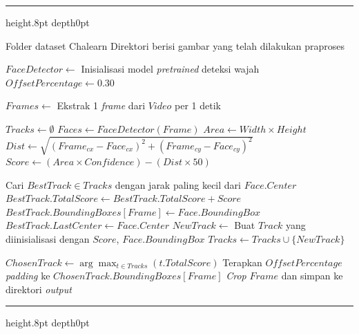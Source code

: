 {
	\vspace{2ex}
	\hrule height.8pt depth0pt \kern4pt
	
	\begin{algorithmic}[1]
		\Input Folder dataset Chalearn
		\Output Direktori berisi gambar yang telah dilakukan praproses
		
		\State $FaceDetector \gets$ Inisialisasi model \textit{pretrained} deteksi wajah
		\State $OffsetPercentage \gets 0.30$ 
		
		\State $Frames \gets$ Ekstrak 1 \textit{frame} dari $Video$ per 1 detik 
		
		\State $Tracks \gets \emptyset$ 
		\State $Faces \gets FaceDetector(Frame)$
		\State $Area \gets Width \times Height$
		\State $Dist \gets \sqrt{(Frame_{cx} - Face_{cx})^2 + (Frame_{cy} - Face_{cy})^2}$
		\State $Score \gets (Area \times Confidence) - (Dist \times 50)$
		
		\State Cari $BestTrack \in Tracks$ dengan jarak paling kecil dari $Face.Center$
		\State $BestTrack.TotalScore \gets BestTrack.TotalScore + Score$
		\State $BestTrack.BoundingBoxes[Frame] \gets Face.BoundingBox$
		\State $BestTrack.LastCenter \gets Face.Center$
		\Else
		\State $NewTrack \gets$ Buat $Track$ yang diinisialisasi dengan $Score$, $Face.BoundingBox$
		\State $Tracks \gets Tracks \cup \{NewTrack\}$
		\EndIf
		\EndFor
		\EndFor
		
		 
		\State $ChosenTrack \gets \arg\max_{t \in Tracks} (t.TotalScore)$
		\State Terapkan $OffsetPercentage$ \textit{padding} ke $ChosenTrack.BoundingBoxes[Frame]$
		\State \textit{Crop} $Frame$ dan simpan ke direktori \textit{output}
		\EndIf
		\EndFor
		\EndIf
		\EndFor
	\end{algorithmic}
	
	\nopagebreak %
	\kern2pt\hrule height.8pt depth0pt \kern15pt 
	\nopagebreak
	\label{alg:praproses-dataset}
	
}


